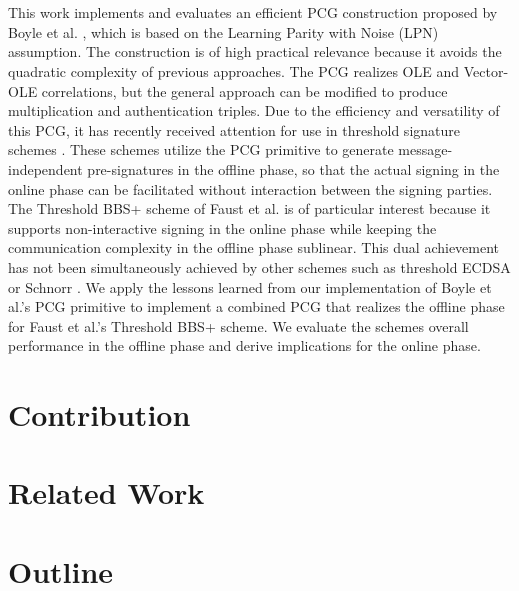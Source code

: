 \\\\
This work implements and evaluates an efficient PCG construction proposed by Boyle et al. \cite{boyle2020efficient}, which is based on the Learning Parity with Noise (LPN) assumption. The construction is of high practical relevance because it avoids the quadratic complexity of previous approaches. The PCG realizes OLE and Vector-OLE correlations, but the general approach can be modified to produce multiplication and authentication triples. Due to the efficiency and versatility of this PCG, it has recently received attention for use in threshold signature schemes \cite{abram2022low, cryptoeprint:2023/1076}. These schemes utilize the PCG primitive to generate message-independent pre-signatures in the offline phase, so that the actual signing in the online phase can be facilitated without interaction between the signing parties. The Threshold BBS+ scheme of Faust et al. \cite{cryptoeprint:2023/1076} is of particular interest because it supports non-interactive signing in the online phase while keeping the communication complexity in the offline phase sublinear. This dual achievement has not been simultaneously achieved by other schemes such as threshold ECDSA \cite{abram2022low} or Schnorr \cite{kondi2023two}. We apply the lessons learned from our implementation of Boyle et al.'s PCG primitive to implement a combined PCG that realizes the offline phase for Faust et al.'s Threshold BBS+ scheme. We evaluate the schemes overall performance in the offline phase and derive implications for the online phase.

\section{Contribution}


\section{Related Work}
\section{Outline}